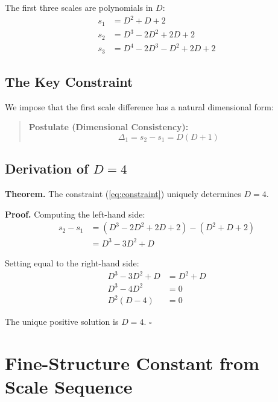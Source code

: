 \documentclass[11pt,a4paper]{article}
\begin{document}
The first three scales are polynomials in $D$:
\begin{align}
s_1 &= D^2 + D + 2 \nonumber\\
s_2 &= D^3 - 2D^2 + 2D + 2 \nonumber\\
s_3 &= D^4 - 2D^3 - D^2 + 2D + 2
\end{align}

\subsection{The Key Constraint}

We impose that the first scale difference has a natural dimensional form:

\begin{quote}
\textbf{Postulate (Dimensional Consistency):}
\begin{equation}
\Delta_1 = s_2 - s_1 = D(D+1)
\label{eq:constraint}
\end{equation}
\end{quote}

\subsection{Derivation of $D = 4$}

\textbf{Theorem.} The constraint (\ref{eq:constraint}) uniquely determines $D = 4$.

\textbf{Proof.} Computing the left-hand side:
\begin{align}
s_2 - s_1 &= (D^3 - 2D^2 + 2D + 2) - (D^2 + D + 2) \nonumber\\
&= D^3 - 3D^2 + D
\end{align}

Setting equal to the right-hand side:
\begin{align}
D^3 - 3D^2 + D &= D^2 + D \nonumber\\
D^3 - 4D^2 &= 0 \nonumber\\
D^2(D - 4) &= 0
\end{align}

The unique positive solution is $\boxed{D = 4}$. \hfill $\square$

\section{Fine-Structure Constant from Scale Sequence}
\end{document}
